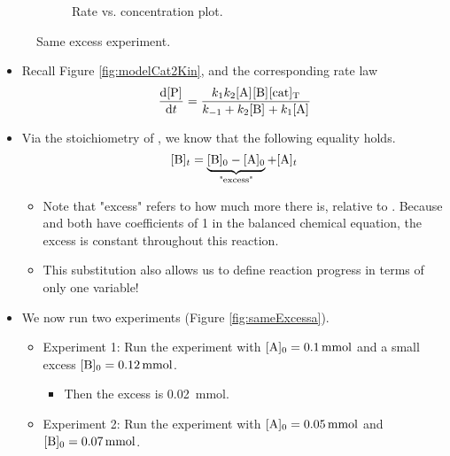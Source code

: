 \documentclass[../notes.tex]{subfiles}
\begin{document}
\begin{itemize}
\begin{figure}[h!]
\begin{subfigure}[b]{0.4\linewidth}
            \caption{Rate vs. concentration plot.}
            \label{fig:sameExcessb}
        \end{subfigure}
        \caption{Same excess experiment.}
        \label{fig:sameExcess}
    \end{figure}
    \begin{itemize}
        \item Recall Figure \ref{fig:modelCat2Kin}, and the corresponding rate law
        \begin{equation*}
            \dv{\cnc{P}}{t} = \frac{k_1k_2\cnc{A}\cnc{B}\cnc[T]{cat}}{k_{-1}+k_2\cnc{B}+k_1\cnc{A}}
        \end{equation*}
        \item Via the stoichiometry of , we know that the following equality holds.
        \begin{equation*}
            \cnc[$t$]{B} = \underbrace{\cnc[0]{B}-\cnc[0]{A}}_\text{"excess"}+\cnc[$t$]{A}
        \end{equation*}
        \begin{itemize}
            \item Note that "excess" refers to how much more  there is, relative to . Because  and  both have coefficients of 1 in the balanced chemical equation, the excess is constant throughout this reaction.
            \item This substitution also allows us to define reaction progress in terms of only one variable!
        \end{itemize}
        \item We now run two experiments (Figure \ref{fig:sameExcessa}).
        \begin{itemize}
            \item Experiment 1: Run the experiment with $\cnc[0]{A}=\SI{0.1}{\milli\mole}$ and a small excess $\cnc[0]{B}=\SI{0.12}{\milli\mole}$.
            \begin{itemize}
                \item Then the excess is \SI{0.02}{\milli\mole}.
            \end{itemize}
            \item Experiment 2: Run the experiment with $\cnc[0]{A}=\SI{0.05}{\milli\mole}$ and $\cnc[0]{B}=\SI{0.07}{\milli\mole}$.
            \begin{itemize}

\end{itemize}
\end{itemize}
\end{itemize}
\end{itemize}
\end{document}
